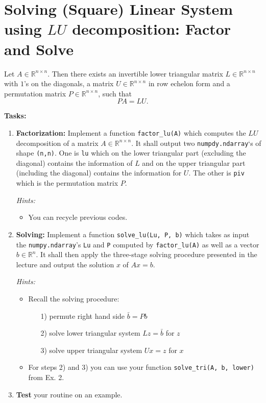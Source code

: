 \section{Solving (Square) Linear System using $LU$ decomposition: Factor and Solve}
Let $A \in \mathbb{R}^{n\times n}$. Then there exists an invertible lower triangular matrix $L\in \mathbb{R}^{n\times n}$ with $1$'s on the diagonals, a matrix $U\in \mathbb{R}^{n\times n}$ in row echelon form and a permutation matrix $P\in \mathbb{R}^{n\times n}$, such that $$PA = LU. $$

\textbf{Tasks:}
\begin{enumerate}
	\item \textbf{Factorization:} Implement a function \verb|factor_lu(A)| which computes the $LU$ decomposition of a matrix $A \in \mathbb{R}^{n\times n}$. It shall output two \verb|numpdy.ndarray|`s of shape \verb|(n,n)|. One is \verb|lu| which on the lower triangular part (excluding the diagonal) contains the information of $L$ and on the upper triangular part (including the diagonal) contains the information for $U$. The other is \verb|piv| which is the permutation matrix $P$.

	\textit{Hints: } 
	\begin{itemize}
		\item You can recycle previous codes.
	\end{itemize}
	

	\item \textbf{Solving:} Implement a function \verb|solve_lu(Lu, P, b)| which takes as input the \verb|numpy.ndarray|'s \verb|Lu| and \verb|P| computed by \verb|factor_lu(A)| as well as a vector $b \in \mathbb{R}^{n}$. It shall then apply the three-stage solving procedure presented in the lecture and output the solution $x$ of $Ax=b$.
	
	
	\textit{Hints: } 
	\begin{itemize}
		\item Recall the solving procedure:
	  \begin{itemize}
			\normalsize
			\item[1)] permute right hand side $\bar{b}=Pb$
			\item[2)] solve lower triangular system $Lz=\bar{b}$ for $z$
			\item[3)] solve upper triangular system $Ux=z$ for $x$
		\end{itemize}
		\item For steps 2) and 3) you can use your function \verb|solve_tri(A, b, lower)| from Ex. 2.
	\end{itemize}

	\item \textbf{Test} your routine on an example.
\end{enumerate}




